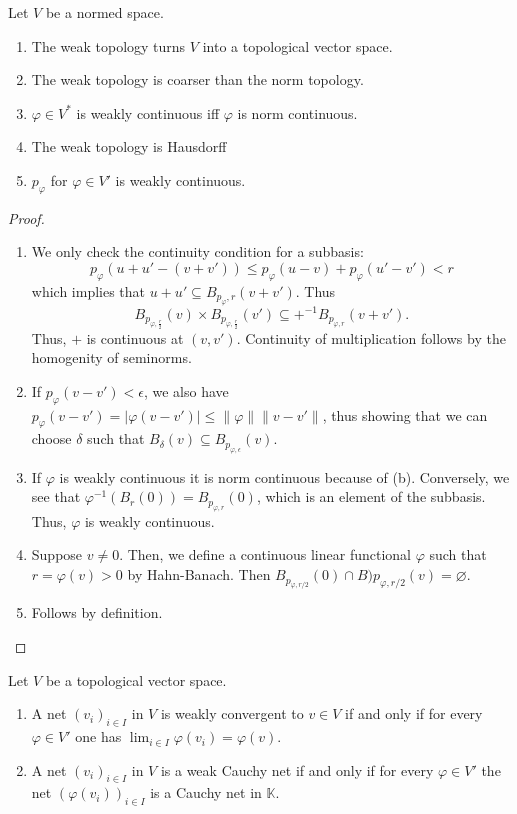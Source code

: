 \documentclass[twoside,symmetric, openany, 12pt]{./tuftebook}
\theoremstyle{definition}
\theoremstyle{definition}
\theoremstyle{definition}
\newenvironment{parts}{\begin{enumerate}[label=(\alph*)]}{\end{enumerate}}
\begin{document}
\begin{Theorem}
	Let $V$ be a normed space.
	\begin{parts}
		\item The weak topology turns $V$ into a topological vector space.
		\item The weak topology is coarser than the norm topology.
		\item $\varphi\in V^*$ is weakly continuous iff $\varphi$ is norm continuous.
		\item The weak topology is Hausdorff
		\item $p_\varphi$ for $\varphi\in V'$ is weakly continuous.
	\end{parts}
\end{Theorem}
\begin{proof}
	\begin{parts}
		\item We only check the continuity condition for a subbasis:
		\[
		p_\varphi(u+u'-(v+v'))\le p_\varphi(u-v)+p_\varphi(u'-v')< r
		\]
		which implies that $u+u'\subseteq B_{p_{\varphi}, r}(v+v')$. Thus
		\[
		B_{p_{\varphi, \frac{r}{2}}}(v)\times B_{p_{\varphi, \frac{r}{2}}}(v')\subseteq +^{-1}B_{p_{\varphi, r}}(v+v')
		.\] 
		Thus, $+$ is continuous at $(v, v')$. Continuity of multiplication follows by the homogenity of seminorms.
		\item If $p_\varphi(v-v')<\epsilon$, we also have $p_\varphi(v-v')=|\varphi(v-v')| \le \| \varphi\| \|v-v'\|$, thus showing that we can choose $\delta$ such that $B_\delta(v)\subseteq B_{p_{\varphi, \epsilon}}(v)$.
		\item If  $\varphi$ is weakly continuous it is norm continuous because of (b). Conversely, we see that $\varphi^{-1}(B_r(0))=B_{p_{\varphi,r}}(0)$, which is an element of the subbasis. Thus, $\varphi$ is weakly continuous.
		\item Suppose $v\neq 0$. Then, we define a continuous linear functional $\varphi$ such that $r=\varphi(v)>0$ by Hahn-Banach. Then $B_{p_{\varphi, r / 2}}(0)\cap B){p_{\varphi, r / 2}}(v )=\varnothing$.
		\item Follows by definition.\qedhere
	\end{parts}
\end{proof}
\begin{Theorem}
	Let $V$ be a topological vector space.
	\begin{parts}
		\item A net $(v_i)_{i\in I}$ in $V$ is weakly convergent to $v\in V$ if and only if for every $\varphi\in V'$ one has $\lim_{i \in I} \varphi(v_i)=\varphi(v)$.
		\item A net $(v_i)_{i\in I}$ in $V$ is a weak Cauchy net if and only if for every $\varphi \in V'$ the net $(\varphi(v_i))_{i\in I}$ is a Cauchy net in $\mathbb{K}$.
	\end{parts}
\end{Theorem}
\end{document}
